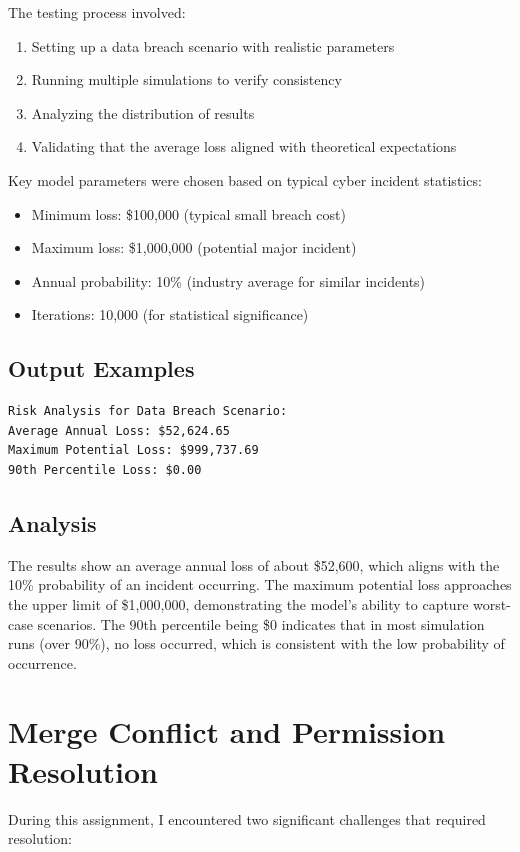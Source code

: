 \documentclass{article}
\begin{document}
The testing process involved:
\begin{enumerate}
    \item Setting up a data breach scenario with realistic parameters
    \item Running multiple simulations to verify consistency
    \item Analyzing the distribution of results
    \item Validating that the average loss aligned with theoretical expectations
\end{enumerate}

Key model parameters were chosen based on typical cyber incident statistics:
\begin{itemize}
    \item Minimum loss: \$100,000 (typical small breach cost)
    \item Maximum loss: \$1,000,000 (potential major incident)
    \item Annual probability: 10\% (industry average for similar incidents)
    \item Iterations: 10,000 (for statistical significance)
\end{itemize}

\subsection{Output Examples}
\begin{verbatim}
Risk Analysis for Data Breach Scenario:
Average Annual Loss: $52,624.65
Maximum Potential Loss: $999,737.69
90th Percentile Loss: $0.00
\end{verbatim}

\subsection{Analysis}
The results show an average annual loss of about \$52,600, which aligns with the 
10\% probability of an incident occurring. The maximum potential loss approaches 
the upper limit of \$1,000,000, demonstrating the model's ability to capture 
worst-case scenarios. The 90th percentile being \$0 indicates that in most 
simulation runs (over 90\%), no loss occurred, which is consistent with the 
low probability of occurrence.

\section{Merge Conflict and Permission Resolution}
During this assignment, I encountered two significant challenges that required resolution:
\end{document}
